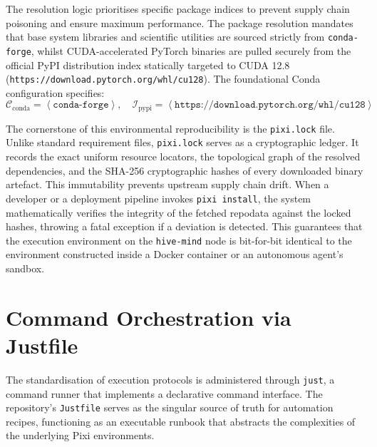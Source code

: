 The resolution logic prioritises specific package indices to prevent supply chain poisoning and ensure maximum performance. The package resolution mandates that base system libraries and scientific utilities are sourced strictly from \texttt{conda-forge}, whilst CUDA-accelerated PyTorch binaries are pulled securely from the official PyPI distribution index statically targeted to CUDA 12.8 (\texttt{https://download.pytorch.org/whl/cu128}). The foundational Conda configuration specifies:
\[
    \mathcal{C}_{\text{conda}} = \left\langle \texttt{conda-forge} \right\rangle, \quad \mathcal{I}_{\text{pypi}} = \left\langle \texttt{https://download.pytorch.org/whl/cu128} \right\rangle
\]

The cornerstone of this environmental reproducibility is the \texttt{pixi.lock} file. Unlike standard requirement files, \texttt{pixi.lock} serves as a cryptographic ledger. It records the exact uniform resource locators, the topological graph of the resolved dependencies, and the SHA-256 cryptographic hashes of every downloaded binary artefact. This immutability prevents upstream supply chain drift. When a developer or a deployment pipeline invokes \texttt{pixi install}, the system mathematically verifies the integrity of the fetched repodata against the locked hashes, throwing a fatal exception if a deviation is detected. This guarantees that the execution environment on the \texttt{hive-mind} node is bit-for-bit identical to the environment constructed inside a Docker container or an autonomous agent's sandbox.

\section{Command Orchestration via Justfile}
\label{sec:justfile_orchestration}

The standardisation of execution protocols is administered through \texttt{just}, a command runner that implements a declarative command interface. The repository's \texttt{Justfile} serves as the singular source of truth for automation recipes, functioning as an executable runbook that abstracts the complexities of the underlying Pixi environments.

